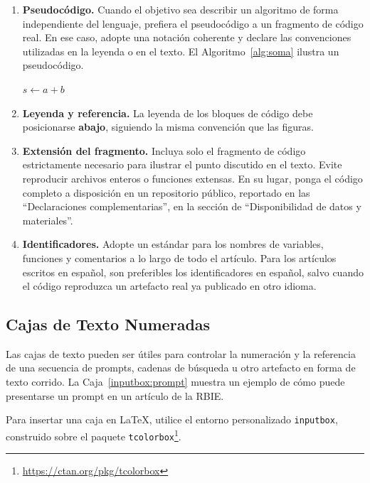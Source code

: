 \documentclass[spanish]{rbie2026}%
\begin{document}
\begin{enumerate}
  \item \textbf{Pseudocódigo.} Cuando el objetivo sea describir un algoritmo de forma independiente del lenguaje, prefiera el pseudocódigo a un fragmento de código real. En ese caso, adopte una notación coherente y declare las convenciones utilizadas en la leyenda o en el texto. El Algoritmo~\ref{alg:soma} ilustra un pseudocódigo.


\begin{algorithm}
    \caption{Algoritmo de suma}
    \label{alg:soma}
    \begin{algorithmic}[1]
        \State $s \gets a + b$
    \end{algorithmic}
\end{algorithm}


  \item \textbf{Leyenda y referencia.} La leyenda de los bloques de código debe posicionarse \textbf{abajo}, siguiendo la misma convención que las figuras.

  \item \textbf{Extensión del fragmento.} Incluya solo el fragmento de código estrictamente necesario para ilustrar el punto discutido en el texto. Evite reproducir archivos enteros o funciones extensas. En su lugar, ponga el código completo a disposición en un repositorio público, reportado en las ``Declaraciones complementarias'', en la sección de ``Disponibilidad de datos y materiales''.

  \item \textbf{Identificadores.} Adopte un estándar para los nombres de variables, funciones y comentarios a lo largo de todo el artículo. Para los artículos escritos en español, son preferibles los identificadores en español, salvo cuando el código reproduzca un artefacto real ya publicado en otro idioma.
\end{enumerate}


\subsection{Cajas de Texto Numeradas}

Las cajas de texto pueden ser útiles para controlar la numeración y la referencia de una secuencia de prompts, cadenas de búsqueda u otro artefacto en forma de texto corrido. La Caja~\ref{inputbox:prompt} muestra un ejemplo de cómo puede presentarse un prompt en un artículo de la RBIE.

Para insertar una caja en \LaTeX, utilice el entorno personalizado \texttt{inputbox}, construido sobre el paquete \texttt{tcolorbox}\footnote{\url{https://ctan.org/pkg/tcolorbox}}.
\end{document}
